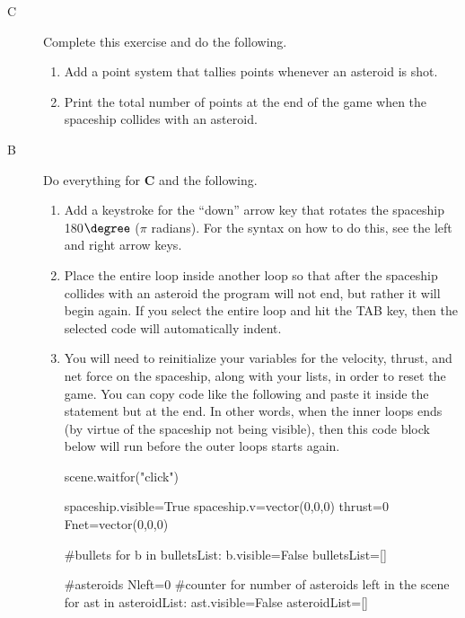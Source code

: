 \pagebreak

\analysis

\begin{description}

\item[C] Complete this exercise and do the following.

\begin{enumerate}
	\item Add a point system that tallies points whenever an asteroid is shot.
	\item Print the total number of points at the end of the game when the spaceship collides with an asteroid.
\end{enumerate}


\item[B] Do everything for {\bf C} and the following.

\begin{enumerate}
	\item Add a keystroke for the ``down'' arrow key that rotates the spaceship 180$\degree$ ($\pi$ radians). For the syntax on how to do this, see the left and right arrow keys.
	\item Place the entire  loop inside another  loop so that after the spaceship collides with an asteroid the program will not end, but rather it will begin again. If you select the entire  loop and hit the TAB key, then the selected code will automatically indent.
	
	\item You will need to reinitialize your variables for the velocity, thrust, and net force on the spaceship, along with your lists, in order to reset the game. You can copy code like the following and paste it inside the  statement but at the end. In other words, when the inner loops ends (by virtue of the spaceship not being visible), then this code block below will run before the outer loops starts again.
		
\begin{myvpython}    
    scene.waitfor("click")

    spaceship.visible=True
    spaceship.v=vector(0,0,0)
    thrust=0
    Fnet=vector(0,0,0)
    
    #bullets
    for b in bulletsList:
        b.visible=False
    bulletsList=[]
    
    #asteroids
    Nleft=0 #counter for number of asteroids left in the scene
    for ast in asteroidList:
        ast.visible=False
    asteroidList=[]


\end{myvpython}
\end{enumerate}
\end{description}
